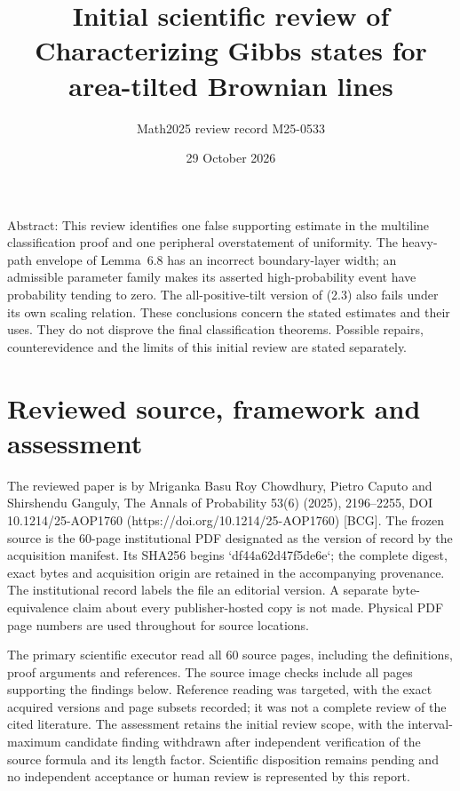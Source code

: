 \documentclass[10pt]{article}
\title{Initial scientific review of
Characterizing Gibbs states for area-tilted Brownian lines}
\author{Math2025 review record M25-0533}
\date{29 October 2026}
\begin{document}
\maketitle
Abstract: This review identifies one false supporting estimate in the multiline classification proof and one peripheral overstatement of uniformity. The heavy-path envelope of Lemma 6.8 has an incorrect boundary-layer width; an admissible parameter family makes its asserted high-probability event have probability tending to zero. The all-positive-tilt version of (2.3) also fails under its own scaling relation. These conclusions concern the stated estimates and their uses. They do not disprove the final classification theorems. Possible repairs, counterevidence and the limits of this initial review are stated separately.\par
\section*{Reviewed source, framework and assessment}
The reviewed paper is by Mriganka Basu Roy Chowdhury, Pietro Caputo and Shirshendu Ganguly, The Annals of Probability 53(6) (2025), 2196–2255, DOI 10.1214/25-AOP1760 (https://doi.org/10.1214/25-AOP1760) [BCG]. The frozen source is the 60-page institutional PDF designated as the version of record by the acquisition manifest. Its SHA256 begins `df44a62d47f5de6e`; the complete digest, exact bytes and acquisition origin are retained in the accompanying provenance. The institutional record labels the file an editorial version. A separate byte-equivalence claim about every publisher-hosted copy is not made. Physical PDF page numbers are used throughout for source locations.\par
The primary scientific executor read all 60 source pages, including the definitions, proof arguments and references. The source image checks include all pages supporting the findings below. Reference reading was targeted, with the exact acquired versions and page subsets recorded; it was not a complete review of the cited literature. The assessment retains the initial review scope, with the interval-maximum candidate finding withdrawn after independent verification of the source formula and its length factor. Scientific disposition remains pending and no independent acceptance or human review is represented by this report.\par
\end{document}
